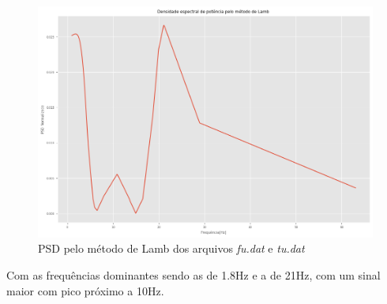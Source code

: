 \documentclass[12pt,a4paper,portuguese]{article}
\begin{document}
\begin{figure}[H]
	\centering
	\includegraphics[width=1\linewidth]{lista5-4b}
	\caption{PSD pelo método de Lamb dos arquivos \textit{fu.dat} e \textit{tu.dat}}
	\label{fig:lista5-4b}
\end{figure}
Com as frequências dominantes sendo as de 1.8Hz e a de 21Hz, com um sinal maior com pico próximo a 10Hz.
\end{document}
